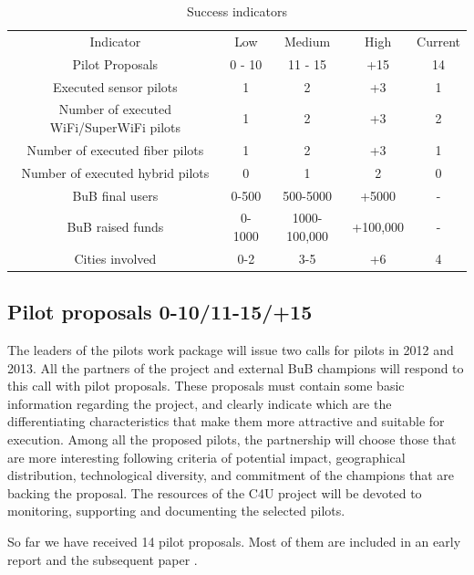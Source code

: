 \documentclass[draftclsnofoot,12pt,journal,onecolumn]{IEEEtran}
\begin{document}
\begin{table}[!t]
\renewcommand{\arraystretch}{1.3}
\caption{Success indicators}
\label{tab:indicators}
\centering
\begin{tabular}{|c|c|c|c|c|}
\hline
Indicator & Low & Medium & High & Current\\
Pilot Proposals & 0 - 10 & 11 - 15 & +15 & 14\\
Executed sensor pilots & 1 & 2 & +3 & 1\\
Number of executed WiFi/SuperWiFi pilots& 1 & 2 & +3 & 2\\
Number of executed fiber pilots& 1 & 2 & +3 & 1\\
Number of executed hybrid pilots& 0 & 1 & 2 & 0\\
BuB final users & 0-500 & 500-5000 & +5000 & -\\
BuB raised funds & 0-1000 & 1000-100,000& +100,000 & -\\
Cities involved & 0-2 & 3-5 & +6 & 4\\
\hline
\end{tabular}
\end{table}


\subsection{Pilot proposals 0-10/11-15/+15}

The leaders of the pilots work package will issue two calls for pilots
in 2012 and 2013. All the partners of the project and external BuB
champions will respond to this call with pilot proposals. These
proposals must contain some basic information regarding the project,
and clearly indicate which are the differentiating characteristics
that make them more attractive and suitable for execution. Among all
the proposed pilots, the partnership will choose those that are more
interesting following criteria of potential impact, geographical
distribution, technological diversity, and commitment of the champions
that are backing the proposal. The resources of the C4U project will
be devoted to monitoring, supporting and documenting the selected
pilots.

So far we have received 14 pilot proposals.
Most of them are included in an early report \cite{barcelo2012bpp} and the subsequent paper \cite{barcelo2012bub}.
\end{document}
